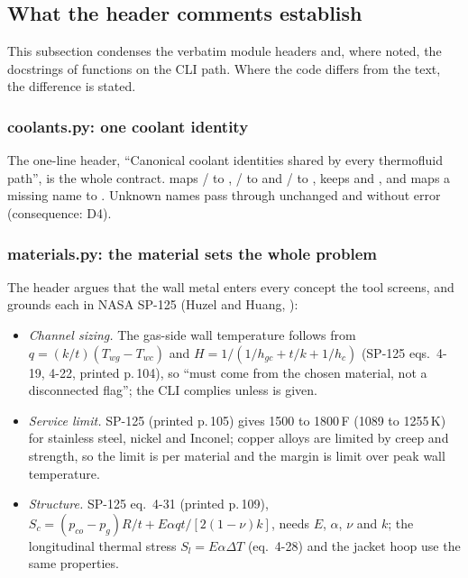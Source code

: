 \subsection{What the header comments establish}\label{sec:s07-headers}

This subsection condenses the verbatim module headers and, where noted, the docstrings of functions on the CLI path. Where the code differs from the text, the difference is stated.

\subsubsection*{coolants.py: one coolant identity}

The one-line header, ``Canonical coolant identities shared by every thermofluid path'', is the whole contract.  maps / to , / to  and / to , keeps  and , and maps a missing name to . Unknown names pass through unchanged and without error (consequence: D4).

\subsubsection*{materials.py: the material sets the whole problem}

The header argues that the wall metal enters every concept the tool screens, and grounds each in NASA SP-125 (Huzel and Huang, ):

\begin{itemize}
\item \emph{Channel sizing.} The gas-side wall temperature follows from $q = (k/t)(T_{wg}-T_{wc})$ and $H = 1/(1/h_{gc} + t/k + 1/h_c)$ (SP-125 eqs.\ 4-19, 4-22, printed p.\,104), so  ``must come from the chosen material, not a disconnected flag''; the CLI complies unless  is given.
\item \emph{Service limit.} SP-125 (printed p.\,105) gives 1500 to 1800\,\textdegree F (1089 to 1255\,K) for stainless steel, nickel and Inconel; copper alloys are limited by creep and strength, so the limit is per material and the margin is limit over peak wall temperature.
\item \emph{Structure.} SP-125 eq.\ 4-31 (printed p.\,109), $S_c = (p_{co}-p_g)R/t + E\alpha q t/[2(1-\nu)k]$, needs $E$, $\alpha$, $\nu$ and $k$; the longitudinal thermal stress $S_l = E\alpha\Delta T$ (eq.\ 4-28) and the jacket hoop use the same properties.
\end{itemize}

